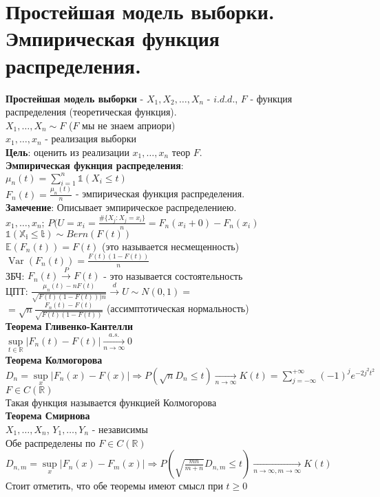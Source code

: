 \documentclass{article}
\newcommand\0{\mathbb{0}}
\DeclareMathOperator{\Var}{Var}
\newcommand\1{\mathbb{1}}
\begin{document}
\section{Простейшая модель выборки. Эмпирическая функция распределения.}
\textbf{Простейшая модель выборки} - $X_1, X_2, \dots, X_n$ - $i.d.d.$, $F$ - функция распределения (теоретическая функция).\\
$X_1, \dots, X_n \sim F$ ($F$ мы не знаем априори)\\
$x_1, \dots, x_n$ - реализация выборки\\
\textbf{Цель}: оценить из реализации $x_1, \dots, x_n$ теор $F$.\\
\textbf{Эмпирическая фукнция распределения}:\\
$\mu_n(t) = \displaystyle\sum_{i = 1}^{n} \mathbb{1}(X_i \leq t)$\\
$F_n(t) = \frac{\mu_n(t)}{n}$ - эмпирическая функция распределения.\\
\newpage
\textbf{Замечение}: Описывает эмпирическое распределениею.\\
$x_1, \dots, x_n$; $P(U = x_i = \frac{\#\{{X_j:X_j = x_i}\}}{n} = F_n(x_i + 0) - F_n(x_i)$\\
$\mathbb{1(X_i \leq t)} \sim Bern(F(t))$\\
$\mathbb{E}(F_n(t)) = F(t)$ (это называется несмещенность)\\
$\Var(F_n(t)) = \frac{F(t)(1 - F(t))}{n}$\\
ЗБЧ: $F_n(t) \xrightarrow{\text{$P$}} F(t)$ - это называется состоятельность\\
ЦПТ: $\frac{\mu_n(t) - nF(t)}{\sqrt{F(t)(1 - F(t)))n}} \xrightarrow{d} U \sim N(0,1) = $\\
$= \sqrt{n}\frac{F_n(t) - F(t)}{\sqrt{F(t)(1 - F(t))}}$ (ассимптотическая нормальность)\\
\textbf{Теорема Гливенко-Кантелли}\\
$\underset{t \in \mathbb{R}}{\sup}|F_n(t) - F(t)| \xrightarrow[n \to \infty]{a.s.} 0$\\
\textbf{Теорема Колмогорова}\\
$D_n = \underset{x}{\sup} |F_n(x) - F(x)| \Rightarrow P(\sqrt{n} D_n \leq t) \xrightarrow[n \to \infty]{} K(t) = \displaystyle\sum_{j = -\infty}^{+\infty} (-1)^je^{-2j^2t^2}$\\
$F \in C(\mathbb{R})$\\
Такая функция называется функцией Колмогорова\\
\textbf{Теорема Смирнова}\\
$X_1, \dots, X_n$, $Y_1, \dots, Y_n$ - независимы\\
Обе распределены по $F \in C(\mathbb{R})$\\
$D_{n,m} = \underset{x}{\sup} |F_n(x) - F_m(x)| \Rightarrow P(\sqrt{\frac{mn}{m + n}} D_{n,m} \leq t) \xrightarrow[n \to \infty, m \to \infty]{} K(t)$\\
Стоит отметить, что обе теоремы имеют смысл при $t \geq 0$\\
\end{document}
